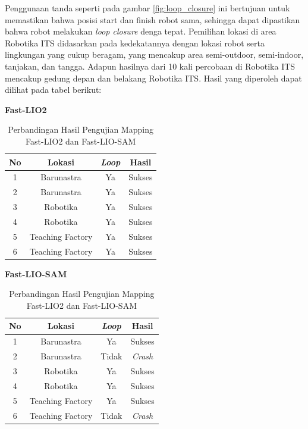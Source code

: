 Penggunaan tanda seperti pada gambar \ref{fig:loop_closure} ini bertujuan untuk memastikan bahwa posisi start dan finish robot
sama, sehingga dapat dipastikan bahwa robot melakukan \emph{loop closure} denga tepat. Pemilihan lokasi di area Robotika ITS didasarkan pada kedekatannya dengan lokasi robot serta lingkungan yang cukup beragam, yang mencakup area semi-outdoor, semi-indoor, tanjakan, dan tangga. Adapun hasilnya dari 10 kali percobaan di Robotika
ITS mencakup gedung depan dan belakang Robotika ITS. Hasil yang diperoleh dapat dilihat pada tabel berikut:

\begin{table}[H]
	\centering
	\caption{Perbandingan Hasil Pengujian Mapping Fast-LIO2 dan Fast-LIO-SAM}
	\label{tab:perbandingan_mapping}
	\begin{minipage}{0.48\textwidth}
		\centering
		\textbf{Fast-LIO2} \\
		\vspace{0.2cm}
		\begin{tabular}{|c|c|c|c|}
			\hline
			\textbf{No} & \textbf{Lokasi}  & \textbf{\emph{Loop}} & \textbf{Hasil} \\
			\hline
			1           & Barunastra       & Ya                   & Sukses         \\
			2           & Barunastra       & Ya                   & Sukses         \\
			3           & Robotika         & Ya                   & Sukses         \\
			4           & Robotika         & Ya                   & Sukses         \\
			5           & Teaching Factory & Ya                   & Sukses         \\
			6           & Teaching Factory & Ya                   & Sukses         \\
			\hline
		\end{tabular}
	\end{minipage}
	\hfill
	\begin{minipage}{0.48\textwidth}
		\centering
		\textbf{Fast-LIO-SAM} \\
		\vspace{0.2cm}
		\begin{tabular}{|c|c|c|c|}
			\hline
			\textbf{No} & \textbf{Lokasi}  & \textbf{\emph{Loop}} & \textbf{Hasil} \\
			\hline
			1           & Barunastra       & Ya                   & Sukses         \\
			2           & Barunastra       & Tidak                & \emph{Crash}   \\
			3           & Robotika         & Ya                   & Sukses         \\
			4           & Robotika         & Ya                   & Sukses         \\
			5           & Teaching Factory & Ya                   & Sukses         \\
			6           & Teaching Factory & Tidak                & \emph{Crash}   \\
			\hline
		\end{tabular}
	\end{minipage}
\end{table}

